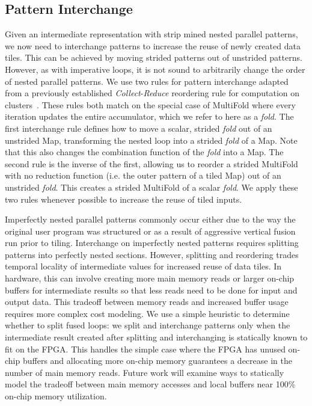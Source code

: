 \subsection{Pattern Interchange}
Given an intermediate representation with strip mined nested parallel patterns, we now need to interchange patterns to increase the reuse
of newly created data tiles. This can be achieved by moving strided patterns out of unstrided patterns. However, as with imperative loops,
it is not sound to arbitrarily change the order of nested parallel patterns.
We use two rules for pattern interchange adapted from a previously established \emph{Collect}-\emph{Reduce} reordering rule for computation on clusters~\cite{brown16clusters}.
These rules both match on the special case of MultiFold where every iteration updates the entire accumulator, which we refer to here as a \emph{fold}.
The first interchange rule defines how to move a scalar, strided \emph{fold} out of an unstrided Map, transforming the nested loop into a strided \emph{fold} of a Map.
Note that this also changes the combination function of the \emph{fold} into a Map.
The second rule is the inverse of the first, allowing us to reorder a strided MultiFold with no reduction function (i.e. the outer pattern of a tiled Map)
out of an unstrided \emph{fold}. This creates a strided MultiFold of a scalar \emph{fold}. We apply these two rules whenever possible to increase the reuse
of tiled inputs.

Imperfectly nested parallel patterns commonly occur either due to the way the original user program was structured or
as a result of aggressive vertical fusion run prior to tiling.
Interchange on imperfectly nested patterns requires splitting patterns into perfectly nested sections. However, splitting and reordering trades
temporal locality of intermediate values for increased reuse of data tiles. In hardware, this can involve creating more main memory
reads or larger on-chip buffers for intermediate results so that less reads need to be done for input and output data. This tradeoff between memory reads and
increased buffer usage requires more complex cost modeling.
We use a simple heuristic to determine whether to split fused loops: we split and interchange patterns only when
the intermediate result created after splitting and interchanging is statically known to fit on the FPGA. This handles the simple case
where the FPGA has unused on-chip buffers and allocating more on-chip memory guarantees a decrease in the number of main memory reads.
Future work will examine ways to statically model the tradeoff between main memory accesses and local buffers near 100\% on-chip memory utilization.

